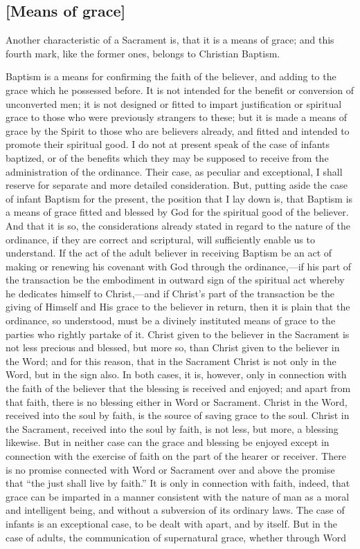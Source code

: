 \documentclass[
]{book}
\begin{document}
\hypertarget{means-of-grace-1}{%
\subsection{{[}Means of grace{]}}\label{means-of-grace-1}}

Another characteristic of a Sacrament is, that it is a means of grace; and this fourth mark, like the former ones, belongs to Christian Baptism.

Baptism is a means for confirming the faith of the believer, and adding to the grace which he possessed before. It is not intended for the benefit or conversion of unconverted men; it is not designed or fitted to impart justification or spiritual grace to those who were previously strangers to these; but it is made a means of grace by the Spirit to those who are believers already, and fitted and intended to promote their spiritual good. I do not at present speak of the case of infants baptized, or of the benefits which they may be supposed to receive from the administration of the ordinance. Their case, as peculiar and exceptional, I shall reserve for separate and more detailed consideration. But, putting aside the case of infant Baptism for the present, the position that I lay down is, that Baptism is a means of grace fitted and blessed by God for the spiritual good of the believer. And that it is so, the considerations already stated in regard to the nature of the ordinance, if they are correct and scriptural, will sufficiently enable us to understand. If the act of the adult believer in receiving Baptism be an act of making or renewing his covenant with God through the ordinance,---if his part of the transaction be the embodiment in outward sign of the spiritual act whereby he dedicates himself to Christ,---and if Christ's part of the transaction be the giving of Himself and His grace to the believer in return, then it is plain that the ordinance, so understood, must be a divinely instituted means of grace to the parties who rightly partake of it. Christ given to the believer in the Sacrament is not less precious and blessed, but more so, than Christ given to the believer in the Word; and for this reason, that in the Sacrament Christ is not only in the Word, but in the sign also. In both cases, it is, however, only in connection with the faith of the believer that the blessing is received and enjoyed; and apart from that faith, there is no blessing either in Word or Sacrament. Christ in the Word, received into the soul by faith, is the source of saving grace to the soul. Christ in the Sacrament, received into the soul by faith, is not less, but more, a blessing likewise. But in neither case can the grace and blessing be enjoyed except in connection with the exercise of faith on the part of the hearer or receiver. There is no promise connected with Word or Sacrament over and above the promise that ``the just shall live by faith.'' It is only in connection with faith, indeed, that grace can be imparted in a manner consistent with the nature of man as a moral and intelligent being, and without a subversion of its ordinary laws. The case of infants is an exceptional case, to be dealt with apart, and by itself. But in the case of adults, the communication of supernatural grace, whether through Word 
\end{document}
